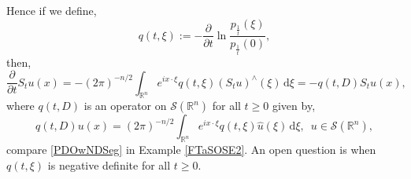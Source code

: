 \documentclass[a4paper, 12pt]{report}
\theoremstyle{cor}
\theoremstyle{remark}
\theoremstyle{definition}
\begin{document}
Hence if we define,
\begin{equation}
q(t, \xi) := -\frac{\partial}{\partial t}\ln\frac{p_\frac{1}{t}(\xi)}{p_\frac{1}{t}(0)},
\end{equation}
then,
$$
\frac{\partial}{\partial t}S_tu(x) = -(2\pi)^{-n/2}\int_{\mathbb{R}^n}e^{ix\cdot\xi}q(t, \xi)(S_tu)^\wedge(\xi)\,\mathrm{d}\xi = -q(t, D)S_tu(x),
$$
where $q(t, D)$ is an operator on $\mathcal{S}(\mathbb{R}^n)$ for all $t \ge 0$ given by,
\begin{equation}
q(t, D)u(x) = (2\pi)^{-n/2}\int_{\mathbb{R}^n}e^{ix\cdot\xi}q(t, \xi)\hat{u}(\xi)\,\mathrm{d}\xi, \,\,\, u \in \mathcal{S}(\mathbb{R}^n),
\end{equation}
compare \eqref{PDOwNDSeg} in Example \ref{FTaSOSE2}.  An open question is when $q(t, \xi)$ is negative definite for all $t \ge 0$.
\end{document}

